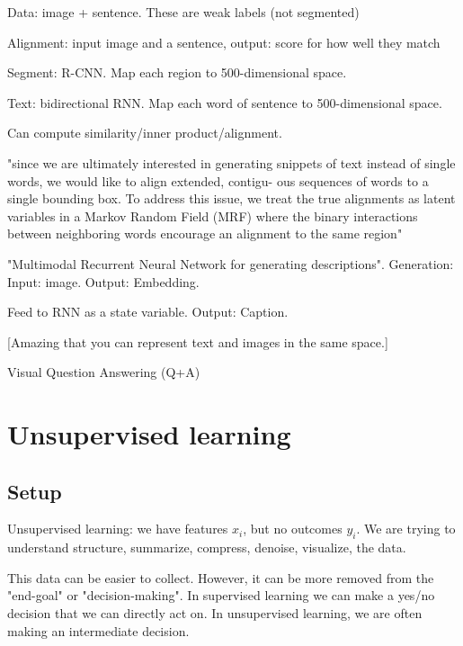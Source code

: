 \documentclass[english]{article}
\begin{document}
\item Data:  image + sentence. These are weak labels (not segmented)

\item Alignment: input image and a sentence, output: score for how well they match

Segment: R-CNN. Map each region to 500-dimensional space.

Text: bidirectional RNN. Map each word of sentence to 500-dimensional space. 

Can compute similarity/inner product/alignment.

"since we are
ultimately interested in generating snippets of text instead
of single words, we would like to align extended, contigu-
ous sequences of words to a single bounding box.
To address this issue, we treat the true alignments as latent
variables in a Markov Random Field (MRF) where the binary interactions between neighboring words encourage an alignment to the same region"

\item "Multimodal Recurrent Neural Network for
generating descriptions". Generation: Input: image. Output: Embedding. 

Feed to RNN as a state variable. Output: Caption.

[Amazing that you can represent text and images in the same space.]
\eenum 

\item Visual Question Answering (Q+A)

\benum 
\item 
\eenum 

 
\eenum 

\section{Unsupervised learning}

\subsection{Setup}

\benum
\item Unsupervised learning: we have features $x_i$, but no outcomes $y_i$. We are trying to understand structure, summarize, compress, denoise, visualize, the data.

This data can be easier to collect. However, it can be more removed from the "end-goal" or "decision-making". In supervised learning we can make a yes/no decision that we can directly act on. In unsupervised learning, we are often making an intermediate decision. 
\end{document}
